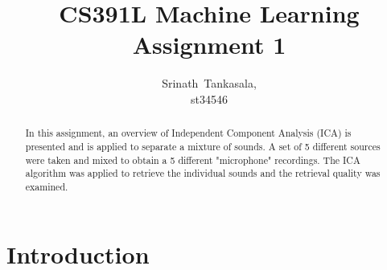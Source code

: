 \documentclass[journal,onecolumn,12pt]{IEEEtran}
\begin{document}
%
\title{CS391L Machine Learning\\ Assignment 1}


\author{Srinath~Tankasala,\\ st34546}






\maketitle

\begin{abstract}

In this assignment, an overview of Independent Component Analysis (ICA) is presented and is applied to separate a mixture of sounds. A set of 5 different sources were taken and mixed to obtain a 5 different "microphone" recordings. The ICA algorithm was applied to retrieve the individual sounds and the retrieval quality was examined.
\end{abstract}

\section{Introduction}



\end{document}
